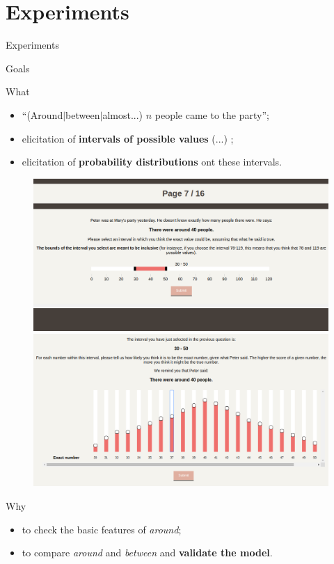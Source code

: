 \documentclass[xcolor=table, hyperref={pdfpagelabels=false}]{beamer}
\begin{document}
\section{Experiments}
\begin{frame}{}
\begin{center}
	\Huge Experiments
\end{center}
\end{frame}
\begin{frame}{Goals}
\begin{block}{What}
	\begin{itemize}
		\item ``(Around$|$between$|$almost...) $n$ people came to the party''; \pause
		\item elicitation of \textbf{intervals of possible values} \small(\cite{Channell1994}...) \normalsize; \pause
		\item elicitation of \textbf{probability distributions} ont these intervals. \pause
	\end{itemize}
\end{block}\vspace{-2mm}
\begin{figure}
	\includegraphics[width=.45\textwidth]{./images/screen_int.png} \quad
	\includegraphics[width=.45\textwidth]{./images/screen_hist.png}
\end{figure}\vspace{-5mm} \pause
\begin{block}{Why}
	\begin{itemize}
		\item to check the basic features of \textit{around}; \pause
		\item to compare \textit{around} and \textit{between} and \textbf{validate the model}.
	\end{itemize}
\end{block}
\end{frame}
\end{document}
